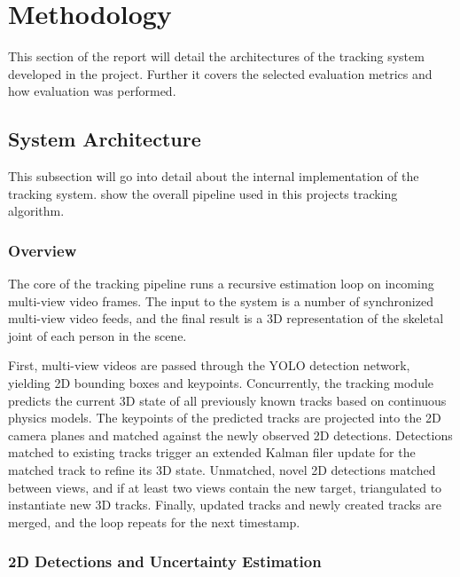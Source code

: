 


\section{Methodology} \label{methodology}

This section of the report will detail the architectures of the tracking system developed in the project. Further it covers the selected evaluation metrics and how evaluation was performed.


\subsection{System Architecture} \label{arch}

This subsection will go into detail about the internal implementation of the tracking system.  show the overall pipeline used in this projects tracking algorithm.


\subsubsection{Overview} \label{arch-overview}

The core of the tracking pipeline runs a recursive estimation loop on incoming multi-view video frames. The input to the system is a number of synchronized multi-view video feeds, and the final result is a 3D representation of the skeletal joint of each person in the scene.

First, multi-view videos are passed through the YOLO detection network, yielding 2D bounding boxes and keypoints. Concurrently, the tracking module predicts the current 3D state of all previously known tracks based on continuous physics models. The keypoints of the predicted tracks are projected into the 2D camera planes and matched against the newly observed 2D detections. Detections matched to existing tracks trigger an extended Kalman filer update for the matched track to refine its 3D state. Unmatched, novel 2D detections matched between views, and if at least two views contain the new target, triangulated to instantiate new 3D tracks. Finally, updated tracks and newly created tracks are merged, and the loop repeats for the next timestamp.


\subsubsection{2D Detections and Uncertainty Estimation} \label{arch-detect}

